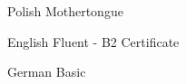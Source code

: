 

\begin{cvskills}

  \cvskill
  {Polish} %
  {Mothertongue} %

  \cvskill
  {English} %
  {Fluent - B2 Certificate} %

  \cvskill
  {German} %
  {Basic} %

\end{cvskills}
